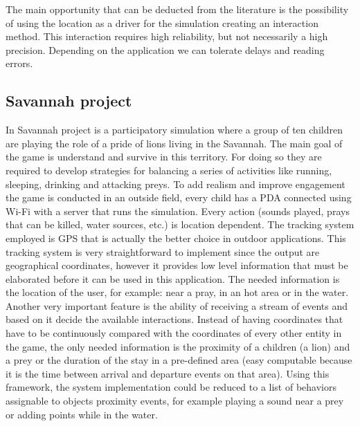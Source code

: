 The main opportunity that can be deducted from the literature is the possibility of using the location as a driver for the simulation creating an interaction method. This interaction requires high reliability, but not necessarily a high precision. Depending on the application we can tolerate delays and reading errors. 

\subsection{Savannah project}
In Savannah project \cite{facer:savannah} is a participatory simulation where a group of ten children are playing the role of a pride of lions living in the Savannah. The main goal of the game is understand and survive in this territory. For doing so they are required to develop strategies for balancing a series of activities like running, sleeping, drinking and attacking preys. To add realism and improve engagement the game is conducted in an outside field, every child has a PDA connected using Wi-Fi with a server that runs the simulation. Every action (sounds played, prays that can be killed, water sources, etc.) is location dependent. The tracking system employed is GPS that is actually the better choice in outdoor applications. This tracking system is very straightforward to implement since the output are geographical coordinates, however it provides low level information that must be elaborated before it can be used in this application. The needed information is the location of the user, for example: near a pray, in an hot area or in the water. Another very important feature is the ability of receiving a stream of events and based on it decide the available interactions. Instead of having coordinates that have to be continuously compared with the coordinates of every other entity in the game, the only needed information is the proximity of a children (a lion) and a prey or the duration of the stay in a pre-defined area (easy computable because it is the time between arrival and departure events on that area). Using this framework, the system implementation could be reduced to a list of behaviors assignable to objects proximity events, for example playing a sound near a prey or adding points while in the water.

